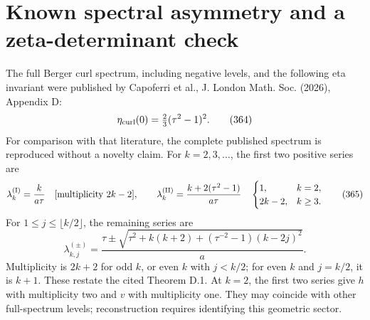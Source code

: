 \documentclass[11pt,a4paper,oneside]{book}
\begin{document}
\section{Known spectral asymmetry and a zeta-determinant check}
The full Berger curl spectrum, including negative levels, and the following eta invariant were published by Capoferri et al., J. London Math. Soc. (2026), Appendix D:
\begin{equation}\eta_{\rm curl}(0)=\tfrac23(\tau^2-1)^2.\tag{364}\end{equation}
For comparison with that literature, the complete published spectrum is reproduced without a novelty claim. For $k=2,3,\ldots$, the first two positive series are
\begin{equation}\lambda_k^{\rm(I)}=\frac{k}{a\tau}\quad[\text{multiplicity }2k-2],\qquad
\lambda_k^{\rm(II)}=\frac{k+2(\tau^2-1)}{a\tau}\quad\begin{cases}1,&k=2,\\2k-2,&k\ge3.\end{cases}\tag{365}\end{equation}
For $1\le j\le\lfloor k/2\rfloor$, the remaining series are
\begin{equation}\lambda_{k,j}^{(\pm)}=\frac{\tau\pm\sqrt{\tau^2+k(k+2)+(\tau^{-2}-1)(k-2j)^2}}a.\tag{366}\end{equation}
Multiplicity is $2k+2$ for odd $k$, or even $k$ with $j<k/2$; for even $k$ and $j=k/2$, it is $k+1$. These restate the cited Theorem D.1. At $k=2$, the first two series give $h$ with multiplicity two and $v$ with multiplicity one. They may coincide with other full-spectrum levels; reconstruction requires identifying this geometric sector.
\end{document}

